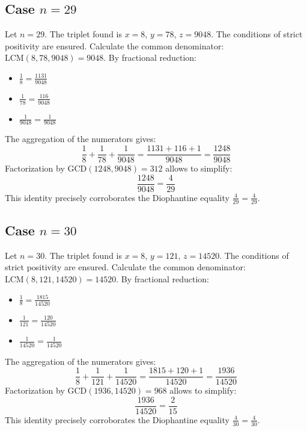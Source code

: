 \documentclass[11pt,a4paper]{article}
\begin{document}
\subsection{Case $n = 29$}
Let $n = 29$. The triplet found is $x = 8$, $y = 78$, $z = 9048$.
The conditions of strict positivity are ensured.
Calculate the common denominator: $\text{LCM}(8, 78, 9048) = 9048$.
By fractional reduction:
\begin{itemize}
    \item $\frac{1}{8} = \frac{1131}{9048}$
    \item $\frac{1}{78} = \frac{116}{9048}$
    \item $\frac{1}{9048} = \frac{1}{9048}$
\end{itemize}
The aggregation of the numerators gives:
$$ \frac{1}{8} + \frac{1}{78} + \frac{1}{9048} = \frac{1131 + 116 + 1}{9048} = \frac{1248}{9048} $$
Factorization by $\text{GCD}(1248, 9048) = 312$ allows to simplify:
$$ \frac{1248}{9048} = \frac{4}{29} $$
This identity precisely corroborates the Diophantine equality $\frac{4}{29} = \frac{4}{29}$.

\subsection{Case $n = 30$}
Let $n = 30$. The triplet found is $x = 8$, $y = 121$, $z = 14520$.
The conditions of strict positivity are ensured.
Calculate the common denominator: $\text{LCM}(8, 121, 14520) = 14520$.
By fractional reduction:
\begin{itemize}
    \item $\frac{1}{8} = \frac{1815}{14520}$
    \item $\frac{1}{121} = \frac{120}{14520}$
    \item $\frac{1}{14520} = \frac{1}{14520}$
\end{itemize}
The aggregation of the numerators gives:
$$ \frac{1}{8} + \frac{1}{121} + \frac{1}{14520} = \frac{1815 + 120 + 1}{14520} = \frac{1936}{14520} $$
Factorization by $\text{GCD}(1936, 14520) = 968$ allows to simplify:
$$ \frac{1936}{14520} = \frac{2}{15} $$
This identity precisely corroborates the Diophantine equality $\frac{4}{30} = \frac{4}{30}$.
\end{document}
